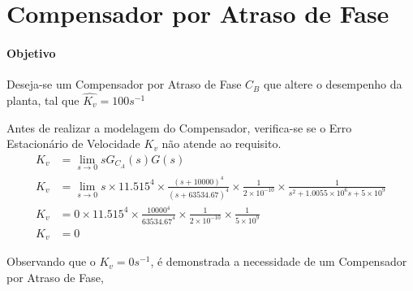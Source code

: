\documentclass[a4paper]{article}
\begin{document}
 \section{Compensador por Atraso de Fase}
 \paragraph{Objetivo} Deseja-se um Compensador por Atraso de Fase $C_B$ que altere o desempenho da planta, tal que $\hat{K_v} = 100s^{-1}$
 \par Antes de realizar a modelagem do Compensador, verifica-se se o Erro Estacionário de Velocidade $K_v$ não atende ao requisito.
 \begin{align}
 K_v &= \lim_{s \to 0} sG_{C_A}(s)G(s) \\
 K_v &= \lim_{s \to 0} s\times11.515^4 \times \frac{(s+10000)^4}{(s+63534.67)^4}\times\frac{1}{2\times10^{-10}}\times\frac{1}{s^2 + 1.0055\times10^{6}s+5\times10^9} \\
 K_v &= 0\times11.515^4 \times \frac{10000^4}{63534.67^4}\times\frac{1}{2\times10^{-10}}\times\frac{1}{5\times10^9}\\
 K_v &= 0
 \end{align}
 \vspace{0.5em}
 \par Observando que o $K_v = 0s^{-1}$, é demonstrada a necessidade de um Compensador por Atraso de Fase, 
\end{document}
